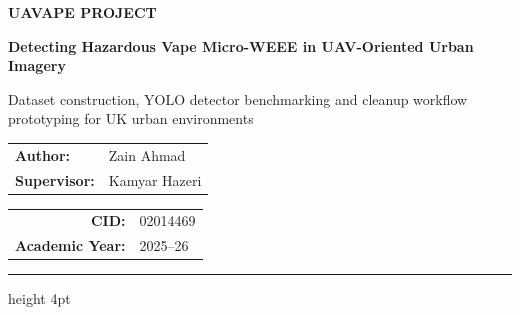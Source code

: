 \begin{titlepage}
    \begin{center}
        \nopagebreak
        {\small\bfseries\textcolor{ImperialBlue}{UAVAPE PROJECT}\par}
        \vspace{0.35cm}
        {\fontsize{28pt}{33pt}\selectfont\bfseries\textcolor{Woodsmoke}{Detecting Hazardous Vape Micro-WEEE in UAV-Oriented Urban Imagery}\par}
        \par
        \vspace{0.55cm}
        {\large\textcolor{Woodsmoke}{Dataset construction, YOLO detector benchmarking and cleanup workflow prototyping for UK urban environments}\par}
    \end{center}

    \vfill

    \noindent
    \begin{minipage}[t]{0.5\textwidth}
        \flushleft
        \fontsize{10.5pt}{15pt}\selectfont
        \renewcommand{\arraystretch}{1.3}
        \begin{tabular}{ll}
            \textbf{\textcolor{ImperialBlue}{Author:}} & Zain Ahmad \\
            \textbf{\textcolor{ImperialBlue}{Supervisor:}} & Kamyar Hazeri \\
        \end{tabular}
    \end{minipage}%
    \begin{minipage}[t]{0.5\textwidth}
        \flushright
        \fontsize{10.5pt}{15pt}\selectfont
        \renewcommand{\arraystretch}{1.3}
        \begin{tabular}{rl}
            \textbf{\textcolor{ImperialBlue}{CID:}} & 02014469 \\
            \textbf{\textcolor{ImperialBlue}{Academic Year:}} & 2025--26 \\
        \end{tabular}
    \end{minipage}

    \vspace{0.4cm} %

    \noindent
    {\color{ImperialBlue}\hrule height 4pt} %
    
    \restoregeometry
\end{titlepage}
